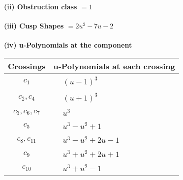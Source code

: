 \documentclass[1p]{elsarticle_modified}
\theoremstyle{definition}
\begin{document}
\flushleft \textbf{(ii) Obstruction class $= 1$}\\~\\
\flushleft \textbf{(iii) Cusp Shapes $= 2 u^2-7 u-2$}\\~\\
\newpage\renewcommand{\arraystretch}{1}
\flushleft \textbf{(iv) u-Polynomials at the component}\newline \\
\begin{tabular}{m{50pt}|m{274pt}}
Crossings & \hspace{64pt}u-Polynomials at each crossing \\
\hline $$\begin{aligned}c_{1}\end{aligned}$$&$\begin{aligned}
&(u-1)^3
\end{aligned}$\\
\hline $$\begin{aligned}c_{2},c_{4}\end{aligned}$$&$\begin{aligned}
&(u+1)^3
\end{aligned}$\\
\hline $$\begin{aligned}c_{3},c_{6},c_{7}\end{aligned}$$&$\begin{aligned}
&u^3
\end{aligned}$\\
\hline $$\begin{aligned}c_{5}\end{aligned}$$&$\begin{aligned}
&u^3- u^2+1
\end{aligned}$\\
\hline $$\begin{aligned}c_{8},c_{11}\end{aligned}$$&$\begin{aligned}
&u^3- u^2+2 u-1
\end{aligned}$\\
\hline $$\begin{aligned}c_{9}\end{aligned}$$&$\begin{aligned}
&u^3+u^2+2 u+1
\end{aligned}$\\
\hline $$\begin{aligned}c_{10}\end{aligned}$$&$\begin{aligned}
&u^3+u^2-1
\end{aligned}$\\
\hline
\end{tabular}\\~\\
\end{document}
